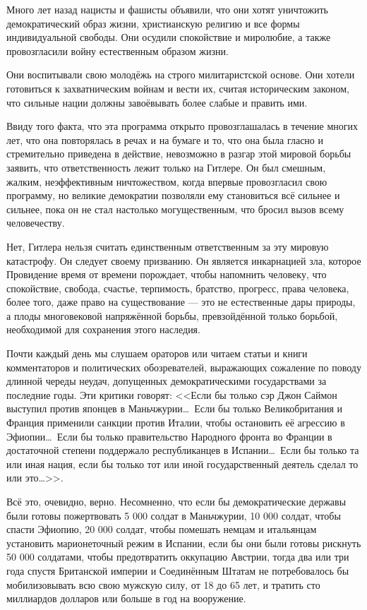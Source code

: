 Много лет назад нацисты и фашисты объявили, что они хотят уничтожить демократический образ жизни, христианскую религию и все формы индивидуальной свободы. Они осудили спокойствие и миролюбие, а также провозгласили войну естественным образом жизни.

Они воспитывали свою молодёжь на строго милитаристской основе. Они хотели готовиться к захватническим войнам и вести их, считая историческим законом, что сильные нации должны завоёвывать более слабые и править ими.

Ввиду того факта, что эта программа открыто провозглашалась в течение многих лет, что она повторялась в речах и на бумаге и то, что она была гласно и стремительно приведена в действие, невозможно в разгар этой мировой борьбы заявить, что ответственность лежит только на Гитлере. Он был смешным, жалким, неэффективным ничтожеством, когда впервые провозгласил свою программу, но великие демократии позволяли ему становиться всё сильнее и сильнее, пока он не стал настолько могущественным, что бросил вызов всему человечеству.

Нет, Гитлера нельзя считать единственным ответственным за эту мировую катастрофу. Он следует своему призванию. Он является инкарнацией зла, которое Провидение время от времени порождает, чтобы напомнить человеку, что спокойствие, свобода, счастье, терпимость, братство, прогресс, права человека, более того, даже право на существование — это не естественные дары природы, а плоды многовековой напряжённой борьбы, превзойдённой только борьбой, необходимой для сохранения этого наследия.

Почти каждый день мы слушаем ораторов или читаем статьи и книги комментаторов и политических обозревателей, выражающих сожаление по поводу длинной череды неудач, допущенных демократическими государствами за последние годы. Эти критики говорят: <<Если бы только сэр Джон Саймон выступил против японцев в Маньчжурии\ldots\ Если бы только Великобритания и Франция применили санкции против Италии, чтобы остановить её агрессию в Эфиопии\ldots\ Если бы только правительство Народного фронта во Франции в достаточной степени поддержало республиканцев в Испании\ldots\ Если бы только та или иная нация, если бы только тот или иной государственный деятель сделал то или это\ldots>>.

Всё это, очевидно, верно. Несомненно, что если бы демократические державы были готовы пожертвовать 5 000 солдат в Маньчжурии, 10 000 солдат, чтобы спасти Эфиопию, 20 000 солдат, чтобы помешать немцам и итальянцам установить марионеточный режим в Испании, если бы они были готовы рискнуть 50 000 солдатами, чтобы предотвратить оккупацию Австрии, тогда два или три года спустя Британской империи и Соединённым Штатам не потребовалось бы мобилизовывать всю свою мужскую силу, от 18 до 65 лет, и тратить сто миллиардов долларов или больше в год на вооружение.

